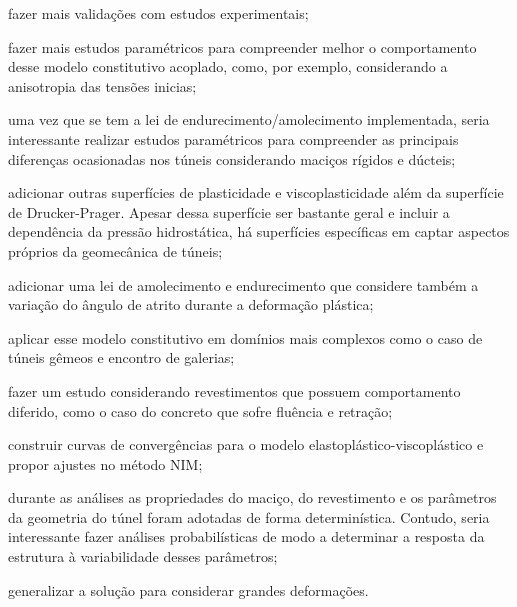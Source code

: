 \begin{alineas}
	
	\item fazer mais validações com estudos experimentais;
	
	\item fazer mais estudos paramétricos para compreender melhor o comportamento desse modelo constitutivo acoplado, como, por exemplo, considerando a anisotropia das tensões inicias;
	
	\item uma vez que se tem a lei de endurecimento/amolecimento implementada, seria interessante realizar estudos paramétricos para compreender as principais diferenças ocasionadas nos túneis considerando maciços rígidos e dúcteis;
	
	\item adicionar outras superfícies de plasticidade e viscoplasticidade além da superfície de Drucker-Prager. Apesar dessa superfície ser bastante geral e incluir a dependência da pressão hidrostática, há superfícies específicas em captar aspectos próprios da geomecânica de túneis;
	
	\item adicionar uma lei de amolecimento e endurecimento que considere também a variação do ângulo de atrito durante a deformação plástica;
	
	\item aplicar esse modelo constitutivo em domínios mais complexos como o caso de túneis gêmeos e encontro de galerias;
	
	\item fazer um estudo considerando revestimentos que possuem comportamento diferido, como o caso do concreto que sofre fluência e retração;
	
	\item construir curvas de convergências para o modelo elastoplástico-viscoplástico e propor ajustes no método NIM;
	
	\item durante as análises as propriedades do maciço, do revestimento e os parâmetros da geometria do túnel foram adotadas de forma determinística. Contudo, seria interessante fazer análises probabilísticas de modo a determinar a resposta da estrutura à variabilidade desses parâmetros;
	
	\item generalizar a solução para considerar grandes deformações.	
	
\end{alineas}